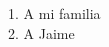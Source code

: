 \documentclass[
12pt, %
spanish, %
singlespacing, %
headsepline, %
]{MastersDoctoralThesis} %
\begin{document}

\begin{acknowledgements}
\addchaptertocentry{\acknowledgementname} %

1. A mi familia\\




2. A Jaime\\


\end{acknowledgements}
\end{document}
